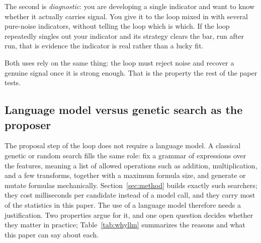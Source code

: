 \documentclass[11pt]{article}
\begin{document}
The second is \emph{diagnostic}: you are developing a single indicator and want to know whether it
actually carries signal. You give it to the loop mixed in with several pure-noise indicators, without
telling the loop which is which. If the loop repeatedly singles out your indicator and its strategy clears
the bar, run after run, that is evidence the indicator is real rather than a lucky fit.

Both uses rely on the same thing: the loop must reject noise and recover a genuine signal once it is
strong enough. That is the property the rest of the paper tests.

\subsection{Language model versus genetic search as the proposer}
\label{sec:whyllm}

The proposal step of the loop does not require a language model. A classical genetic or random search
fills the same role: fix a grammar of expressions over the features, meaning a list of allowed
operations such as addition, multiplication, and a few transforms, together with a maximum formula
size, and generate or mutate formulas mechanically. Section~\ref{sec:method} builds exactly such
searchers; they cost milliseconds per candidate instead of a model call, and they carry most of the
statistics in this paper. The use of a language model therefore needs a justification. Two
properties argue for it, and one open question decides whether they matter in practice;
Table~\ref{tab:whyllm} summarizes the reasons and what this paper can say about each.
\end{document}
